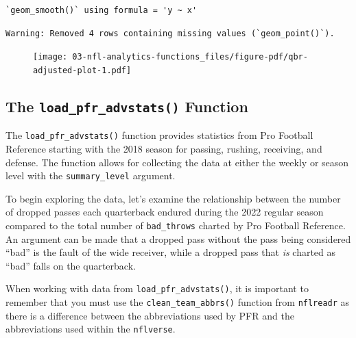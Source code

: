 \documentclass[
  letterpaper,
]{krantz}
\begin{document}
\begin{verbatim}
`geom_smooth()` using formula = 'y ~ x'
\end{verbatim}

\begin{verbatim}
Warning: Removed 4 rows containing missing values (`geom_point()`).
\end{verbatim}

\begin{figure}[H]

{\centering \texttt{[image: 03-nfl-analytics-functions\_files/figure-pdf/qbr-adjusted-plot-1.pdf]}

}

\end{figure}

\hypertarget{the-load_pfr_advstats-function}{%
\subsection{\texorpdfstring{The \texttt{load\_pfr\_advstats()}
Function}{The load\_pfr\_advstats() Function}}\label{the-load_pfr_advstats-function}}

The \texttt{load\_pfr\_advstats()} function provides statistics from Pro
Football Reference starting with the 2018 season for passing, rushing,
receiving, and defense. The function allows for collecting the data at
either the weekly or season level with the \texttt{summary\_level}
argument.

To begin exploring the data, let's examine the relationship between the
number of dropped passes each quarterback endured during the 2022
regular season compared to the total number of \texttt{bad\_throws}
charted by Pro Football Reference. An argument can be made that a
dropped pass without the pass being considered ``bad'' is the fault of
the wide receiver, while a dropped pass that \emph{is} charted as
``bad'' falls on the quarterback.

\begin{tcolorbox}[enhanced jigsaw, colback=white, leftrule=.75mm, breakable, colframe=quarto-callout-important-color-frame, bottomtitle=1mm, rightrule=.15mm, left=2mm, opacityback=0, bottomrule=.15mm, arc=.35mm, coltitle=black, colbacktitle=quarto-callout-important-color!10!white, toptitle=1mm, titlerule=0mm, title=\textcolor{quarto-callout-important-color}{\faExclamation}\hspace{0.5em}{Important}, toprule=.15mm, opacitybacktitle=0.6]

When working with data from \texttt{load\_pfr\_advstats()}, it is
important to remember that you must use the
\texttt{clean\_team\_abbrs()} function from \texttt{nflreadr} as there
is a difference between the abbreviations used by PFR and the
abbreviations used within the \texttt{nflverse}.

\end{tcolorbox}
\end{document}
